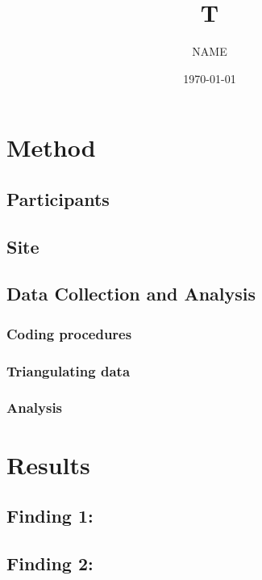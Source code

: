 



\title{T}
\author{NAME}
\date{\today} 
\maketitle

\section{Method}
\subsection{Participants}
\subsection{Site}
\subsection{Data Collection and Analysis}
\subsubsection{Coding procedures}
\subsubsection{Triangulating data}
\subsubsection{Analysis}

\section{Results}
\subsection{Finding 1:}
\subsection{Finding 2:}
